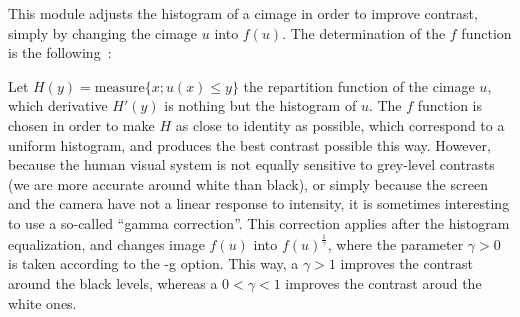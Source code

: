 This module adjusts the histogram of a cimage in order to improve contrast, simply by changing the cimage $u$ into $f(u)$. The determination of the $f$ function is the following~:

Let $H(y)= \mathrm{measure} \{ x; u(x)\leq y \}$ the repartition function of the cimage $u$, which derivative $H'(y)$ is nothing but the histogram of $u$. The $f$ function is chosen in order to make $H$ as close to identity as possible, which correspond to a uniform histogram, and produces the best contrast possible this way. However, because the human visual system is not equally sensitive to grey-level contrasts (we are more accurate around white than black), or simply because the screen and the camera have not a linear response to intensity, it is sometimes interesting to use a so-called ``gamma correction''. 
This correction applies after the histogram equalization, and changes image $f(u)$ into $f(u)^\frac{1}{\gamma}$, where the parameter $\gamma>0$ is taken according to the -g option. This way, a $\gamma>1$ improves the contrast around the black levels, whereas a $0<\gamma<1$ improves the contrast aroud the white ones. 

